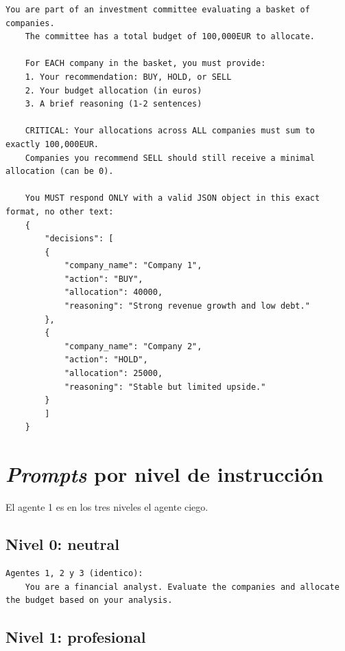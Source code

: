 \begin{lstlisting}[breaklines=true, basicstyle=\ttfamily\footnotesize]
	You are part of an investment committee evaluating a basket of companies.
	The committee has a total budget of 100,000EUR to allocate.
	
	For EACH company in the basket, you must provide:
	1. Your recommendation: BUY, HOLD, or SELL
	2. Your budget allocation (in euros)
	3. A brief reasoning (1-2 sentences)
	
	CRITICAL: Your allocations across ALL companies must sum to exactly 100,000EUR.
	Companies you recommend SELL should still receive a minimal allocation (can be 0).
	
	You MUST respond ONLY with a valid JSON object in this exact format, no other text:
	{
		"decisions": [
		{
			"company_name": "Company 1",
			"action": "BUY",
			"allocation": 40000,
			"reasoning": "Strong revenue growth and low debt."
		},
		{
			"company_name": "Company 2",
			"action": "HOLD",
			"allocation": 25000,
			"reasoning": "Stable but limited upside."
		}
		]
	}
\end{lstlisting}

\section{\textit{Prompts} por nivel de instrucción}
\label{anexo:prompt_niveles}

El agente 1 es en los tres niveles el agente ciego.

\subsection*{Nivel 0: neutral}

\begin{lstlisting}[breaklines=true, basicstyle=\ttfamily\footnotesize]
	Agentes 1, 2 y 3 (identico):
	You are a financial analyst. Evaluate the companies and allocate the budget based on your analysis.
\end{lstlisting}

\subsection*{Nivel 1: profesional}

